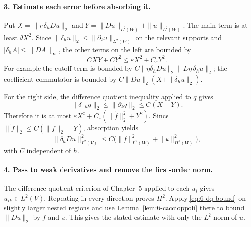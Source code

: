 \begin{expandedproof}
\paragraph{3. Estimate each error before absorbing it.}
Put $X=\|\eta\,\delta_h Du\|_2$ and
$Y=\|Du\|_{L^2(W)}+\|u\|_{L^2(W)}$.
The main term is at least $\theta X^2$.
Since $\|\delta_hu\|_2\leq\|\partial_k u\|_{L^2(W)}$ on the relevant
supports and $|\delta_h A|\leq\|DA\|_\infty$, the other terms on the
left are bounded by
\[
 CXY+CY^2\leq\varepsilon X^2+C_\varepsilon Y^2.
\]
For example the cutoff term is bounded by
$C\|\eta\delta_hDu\|_2\|D\eta\,\delta_hu\|_2$; the coefficient
commutator is bounded by
$C\|Du\|_2(X+\|\delta_hu\|_2)$.

For the right side, the difference quotient inequality applied to $q$
gives
\[
 \|\delta_{-h}q\|_2\leq\|\partial_kq\|_2
 \leq C(X+Y).
\]
Therefore it is at most
$\varepsilon X^2+C_\varepsilon(\|\widetilde f\|_2^2+Y^2)$.
Since $\|\widetilde f\|_2\leq C(\|f\|_2+Y)$, absorption yields
\begin{equation}\label{eq:6-dq-bound}
 \|\delta_h Du\|_{L^2(V)}^2
 \leq C\bigl(\|f\|_{L^2(W)}^2+\|u\|_{H^1(W)}^2\bigr),
\end{equation}
with $C$ independent of $h$.

\Needspace{45mm}
\paragraph{4. Pass to weak derivatives and remove the first-order norm.}
The difference quotient criterion of Chapter~5 applied to each $u_i$
gives $u_{ik}\in L^2(V)$. Repeating in every direction proves $H^2$.
Apply \eqref{eq:6-dq-bound} on slightly larger nested regions and use
Lemma~\ref{lem:6-caccioppoli} there to bound $\|Du\|_2$ by $f$ and $u$.
This gives the stated estimate with only the $L^2$ norm of $u$.
\end{expandedproof}

\Needspace{35mm}

